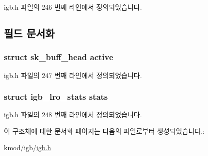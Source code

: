 igb.\+h 파일의 246 번째 라인에서 정의되었습니다.



\subsection{필드 문서화}
\subsubsection[{\texorpdfstring{active}{active}}]{\setlength{\rightskip}{0pt plus 5cm}struct sk\+\_\+buff\+\_\+head active}\hypertarget{structigb__lro__list_a39e915df2bf9d01371a2e69f5587edd7}{}\label{structigb__lro__list_a39e915df2bf9d01371a2e69f5587edd7}


igb.\+h 파일의 247 번째 라인에서 정의되었습니다.

\subsubsection[{\texorpdfstring{stats}{stats}}]{\setlength{\rightskip}{0pt plus 5cm}struct {\bf igb\+\_\+lro\+\_\+stats} stats}\hypertarget{structigb__lro__list_a6f054dd96e8c1605385e4fea3ac0d1da}{}\label{structigb__lro__list_a6f054dd96e8c1605385e4fea3ac0d1da}


igb.\+h 파일의 248 번째 라인에서 정의되었습니다.



이 구조체에 대한 문서화 페이지는 다음의 파일로부터 생성되었습니다.\+:\begin{DoxyCompactItemize}
\item 
kmod/igb/\hyperlink{kmod_2igb_2igb_8h}{igb.\+h}\end{DoxyCompactItemize}
